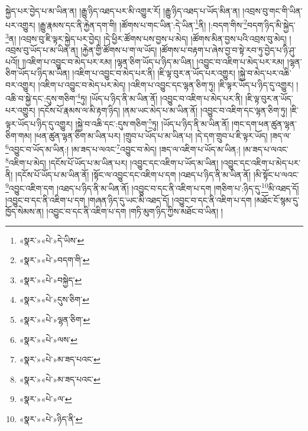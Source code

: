 སྐྱེད་པར་བྱེད་པ་མ་ཡིན་ན། །རྒྱུ་ཉིད་འཐད་པར་མི་འགྱུར་རོ། །རྒྱུ་ཉིད་འཐད་པ་ཡོད་མིན་ན། །འབྲས་བུ་གང་གི་ཡིན་པར་འགྱུར། །རྒྱུ་རྣམས་དང་ནི་རྐྱེན་དག་གི། །ཚོགས་པ་གང་ཡིན་:དེ་ཡིན་\footnote{«སྣར་»«པེ་»དེ་ཡིས་}ནི། །:བདག་གིས་\footnote{«སྣར་»«པེ་»བདག་གི་}བདག་ཉིད་མི་སྐྱེད་\footnote{«སྣར་»«པེ་»བསྐྱེད་}ན། །འབྲས་བུ་ཇི་ལྟར་སྐྱེད་པར་བྱེད། །དེ་ཕྱིར་ཚོགས་པས་བྱས་པ་མེད། །ཚོགས་མིན་བྱས་པའི་འབྲས་བུ་མེད། །འབྲས་བུ་ཡོད་པ་མ་ཡིན་ན། །རྐྱེན་གྱི་ཚོགས་པ་ག་ལ་ཡོད། །ཚོགས་པ་བརྟག་པ་ཞེས་བྱ་བ་སྟེ་རབ་ཏུ་བྱེད་པ་ཉི་ཤུ་པའོ།། །།འཇིག་པ་འབྱུང་བ་མེད་པར་རམ། །ལྷན་ཅིག་ཡོད་པ་ཉིད་མ་ཡིན། །འབྱུང་བ་འཇིག་པ་མེད་པར་རམ། །ལྷན་ཅིག་ཡོད་པ་ཉིད་མ་ཡིན། །འཇིག་པ་འབྱུང་བ་མེད་པར་ནི། །ཇི་ལྟ་བུར་ན་ཡོད་པར་འགྱུར། །སྐྱེ་བ་མེད་པར་འཆི་བར་འགྱུར། །འཇིག་པ་འབྱུང་བ་མེད་པར་མེད། །འཇིག་པ་འབྱུང་དང་ལྷན་ཅིག་ཏུ། །ཇི་ལྟར་ཡོད་པ་ཉིད་དུ་འགྱུར། །འཆི་བ་སྐྱེ་དང་:དུས་གཅིག་\footnote{«སྣར་»«པེ་»དུས་ཅིག་}ཏུ། །ཡོད་པ་ཉིད་ནི་མ་ཡིན་ནོ། །འབྱུང་བ་འཇིག་པ་མེད་པར་ནི། །ཇི་ལྟ་བུར་ན་ཡོད་པར་འགྱུར། །དངོས་པོ་རྣམས་ལ་མི་རྟག་ཉིད། །ནམ་ཡང་མེད་པ་མ་ཡིན་ནོ། །འབྱུང་བ་འཇིག་དང་ལྷན་ཅིག་ཏུ། །ཇི་ལྟར་ཡོད་པ་ཉིད་དུ་འགྱུར། །སྐྱེ་བ་འཆི་དང་:དུས་གཅིག་\footnote{«སྣར་»«པེ་»ལྷན་ཅིག་}ཏུ། །ཡོད་པ་ཉིད་ནི་མ་ཡིན་ནོ། །གང་དག་ཕན་ཚུན་ལྷན་ཅིག་གམ། །ཕན་ཚུན་ལྷན་ཅིག་མ་ཡིན་པར། །གྲུབ་པ་ཡོད་པ་མ་ཡིན་པ། །དེ་དག་གྲུབ་པ་ཇི་ལྟར་ཡོད། །ཟད་ལ་\footnote{«སྣར་»«པེ་»ལས་}འབྱུང་བ་ཡོད་མ་ཡིན:། །མ་ཟད་པ་ལའང་\footnote{«སྣར་»«པེ་»མ་ཟད་པའང་}འབྱུང་བ་མེད། །ཟད་ལ་འཇིག་པ་ཡོད་མ་ཡིན:། །མ་ཟད་པ་ལའང་\footnote{«སྣར་»«པེ་»མ་ཟད་པའང་}འཇིག་པ་མེད། །དངོས་པོ་ཡོད་པ་མ་ཡིན་པར། །འབྱུང་དང་འཇིག་པ་ཡོད་མ་ཡིན། །འབྱུང་དང་འཇིག་པ་མེད་པར་ནི། །དངོས་པོ་ཡོད་པ་མ་ཡིན་ནོ། །སྟོང་ལ་འབྱུང་དང་འཇིག་པ་དག །འཐད་པ་ཉིད་ནི་མ་ཡིན་ནོ། །མི་སྟོང་པ་ལའང་\footnote{«སྣར་»«པེ་»ལ་}འབྱུང་འཇིག་དག །འཐད་པ་ཉིད་ནི་མ་ཡིན་ནོ། །འབྱུང་བ་དང་ནི་འཇིག་པ་དག །གཅིག་པ་:ཉིད་དུ་\footnote{«སྣར་»«པེ་»ཉིད་ནི་}མི་འཐད་དོ། །འབྱུང་བ་དང་ནི་འཇིག་པ་དག །གཞན་ཉིད་དུ་ཡང་མི་འཐད་དོ། །འབྱུང་བ་དང་ནི་འཇིག་པ་དག །མཐོང་ངོ་སྙམ་དུ་ཁྱོད་སེམས་ན། །འབྱུང་བ་དང་ནི་འཇིག་པ་དག །གཏི་མུག་ཉིད་ཀྱིས་མཐོང་བ་ཡིན། །
